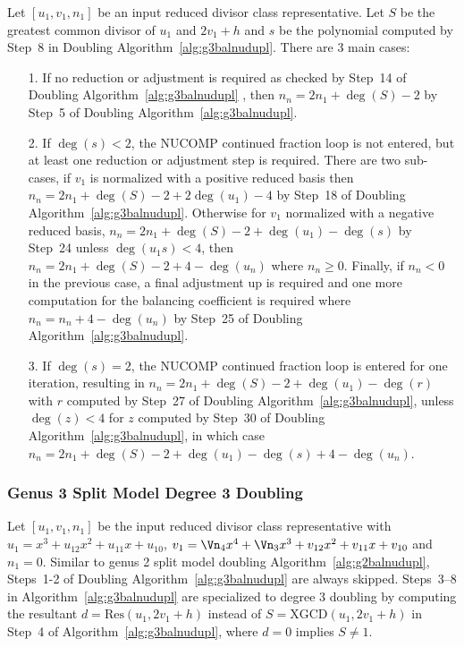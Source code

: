 Let $[u_1,v_1,n_1]$ be an input reduced divisor class representative. Let $S$ be
the greatest common divisor of $u_1$ and $2v_1 + h$ and $s$ be the
polynomial computed by Step~8 in Doubling Algorithm~\ref{alg:g3balnudupl}.
There are 3 main cases:\begin{itemize}
    \item [1.] If no reduction or adjustment is required as checked by Step~14
    of Doubling Algorithm~\ref{alg:g3balnudupl} , then $n_n = 2n_1 + \deg(S) -
    2$ by Step~5 of Doubling Algorithm~\ref{alg:g3balnudupl}.
    \item [2.] If $\deg(s) < 2 $, the NUCOMP continued fraction loop is not
    entered, but at least one reduction or adjustment step is required. There
    are two sub-cases, if $v_1$ is normalized with a positive reduced basis then
    $n_n = 2n_1 + \deg(S) - 2 + 2\deg(u_1) - 4$ by Step~18 of Doubling
    Algorithm~\ref{alg:g3balnudupl}. Otherwise for $v_1$ normalized with a
    negative reduced basis, $n_n = 2n_1 + \deg(S) - 2 + \deg(u_1) - \deg(s)$ by
    Step~24 unless $\deg(u_1s) < 4$, then $n_n = 2n_1 + \deg(S) - 2 + 4 -
    \deg(u_n)$ where $n_n \geq 0$. Finally, if $n_n < 0$ in the previous case, a
    final adjustment up is required and  one more computation for the balancing
    coefficient is required where $n_n = n_n + 4 - \deg(u_n)$ by Step~25 of
    Doubling Algorithm~\ref{alg:g3balnudupl}.
    \item [3.] If $\deg(s) = 2$, the NUCOMP continued fraction loop is entered
    for one iteration, resulting in $n_n = 2n_1 + \deg(S) - 2 + \deg(u_1) -
    \deg(r)$ with $r$ computed by Step~27 of Doubling
    Algorithm~\ref{alg:g3balnudupl}, unless $\deg(z) < 4$ for $z$ computed by
    Step~30 of Doubling Algorithm~\ref{alg:g3balnudupl}, in which case $n_n = 2n_1 +
    \deg(S) - 2 + \deg(u_1) - \deg(s) + 4 - \deg(u_n)$.
\end{itemize}

\subsubsection{Genus 3 Split Model Degree 3 Doubling}
Let $[u_1,v_1,n_1]$ be the input reduced divisor class representative with $u_1 = x^3 +
u_{12}x^2 + u_{11}x + u_{10}$, $v_1 = \Vn_4x^4 + \Vn_3x^3 + v_{12}x^2 + v_{11}x
+ v_{10}$ and $n_1 = 0$. Similar to genus 2 split model doubling
Algorithm~\ref{alg:g2balnudupl}, Steps~1-2 of Doubling
Algorithm~\ref{alg:g3balnudupl} are always skipped. Steps~3--8 in
Algorithm~\ref{alg:g3balnudupl} are specialized to degree 3 doubling by
computing the resultant $d = \mathrm{Res}(u_1,2v_1+h)$ instead of $S =
\mathrm{XGCD}(u_1,2v_1 + h)$ in Step~4 of Algorithm~\ref{alg:g3balnudupl}, where
$d=0$ implies $S \neq 1$. 


